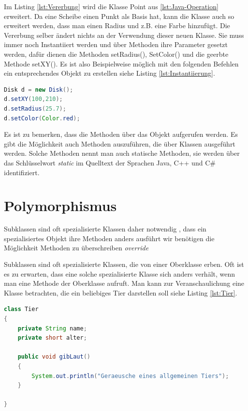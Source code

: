 \documentclass[
	12pt, %
	a4paper,
	listof=totoc, %
	bibliography=totoc, %
	numbers=noenddot, %
	ngerman, %
	headsepline, %
	oneside %
	]{scrbook} %
\begin{document}
Im Listing \ref{lst:Vererbung} wird die Klasse \glqq Point\grqq{}  aus \ref{lst:Java-Operation} erweitert. Da eine Scheibe einen Punkt als Basis hat, kann die Klasse auch so erweitert werden, dass man einen Radius und z.B. eine Farbe hinzufügt. Die Vererbung selber ändert nichts an der Verwendung dieser neuen Klasse. Sie muss immer noch Instantiiert werden und über Methoden ihre Parameter gesetzt werden, dafür dienen die Methoden setRadius(), SetColor() und die geerbte Methode setXY(). Es ist also Beispielweise möglich mit den folgenden Befehlen ein entsprechendes Objekt zu erstellen siehe Listing \ref{lst:Instantiierung}.

\begin{lstlisting}[language=Java, caption=Instantiierung der Klasse Disk \cite{OOPL}, label={lst:Instantiierung}]
Disk d = new Disk();
d.setXY(100,210);
d.setRadius(25.7);
d.setColor(Color.red);
\end{lstlisting}

Es ist zu bemerken, dass die Methoden über das Objekt aufgerufen werden. Es gibt die Möglichkeit auch Methoden auszuführen, die über Klassen ausgeführt werden. Solche Methoden nennt man auch statische Methoden, sie werden über das Schlüsselwort \emph{static} im Quelltext der Sprachen Java, C++ und C\# identifiziert.

\section{Polymorphismus}
Subklassen sind oft spezialisierte Klassen
daher notwendig , dass ein spezialisiertes Objekt ihre Methoden anders ausführt
wir benötigen die Möglichkeit Methoden zu überschreiben \emph{override}

Subklassen sind oft spezialisierte Klassen, die von einer Oberklasse erben. Oft ist es zu erwarten, dass eine solche spezialisierte Klasse sich anders verhält, wenn man eine Methode der Oberklasse aufruft. Man kann zur Veranschaulichung eine Klasse betrachten, die ein beliebiges Tier darstellen soll siehe Listing \ref{lst:Tier}.

\begin{lstlisting}[language=Java, caption=Klasse Tier, label={lst:Tier}]
class Tier
{
    private String name;
    private short alter;
 
    public void gibLaut()
    {
        System.out.println("Geraeusche eines allgemeinen Tiers");
    }

}
\end{lstlisting}
\end{document}
